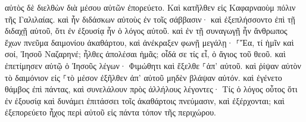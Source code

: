 \documentclass{openreader}
\begin{document}
αὐτὸς δὲ διελθὼν διὰ μέσου αὐτῶν ἐπορεύετο. 
Καὶ κατῆλθεν εἰς Καφαρναοὺμ πόλιν τῆς Γαλιλαίας. καὶ ἦν διδάσκων αὐτοὺς ἐν τοῖς σάββασιν· 
καὶ ἐξεπλήσσοντο ἐπὶ τῇ διδαχῇ αὐτοῦ, ὅτι ἐν ἐξουσίᾳ ἦν ὁ λόγος αὐτοῦ. 
καὶ ἐν τῇ συναγωγῇ ἦν ἄνθρωπος ἔχων πνεῦμα δαιμονίου ἀκαθάρτου, καὶ ἀνέκραξεν φωνῇ μεγάλῃ· 
⸀Ἔα, τί ἡμῖν καὶ σοί, Ἰησοῦ Ναζαρηνέ; ἦλθες ἀπολέσαι ἡμᾶς; οἶδά σε τίς εἶ, ὁ ἅγιος τοῦ θεοῦ. 
καὶ ἐπετίμησεν αὐτῷ ὁ Ἰησοῦς λέγων· Φιμώθητι καὶ ἔξελθε ⸀ἀπ’ αὐτοῦ. καὶ ῥίψαν αὐτὸν τὸ δαιμόνιον εἰς ⸀τὸ μέσον ἐξῆλθεν ἀπ’ αὐτοῦ μηδὲν βλάψαν αὐτόν. 
καὶ ἐγένετο θάμβος ἐπὶ πάντας, καὶ συνελάλουν πρὸς ἀλλήλους λέγοντες· Τίς ὁ λόγος οὗτος ὅτι ἐν ἐξουσίᾳ καὶ δυνάμει ἐπιτάσσει τοῖς ἀκαθάρτοις πνεύμασιν, καὶ ἐξέρχονται; 
καὶ ἐξεπορεύετο ἦχος περὶ αὐτοῦ εἰς πάντα τόπον τῆς περιχώρου. 
\end{document}
